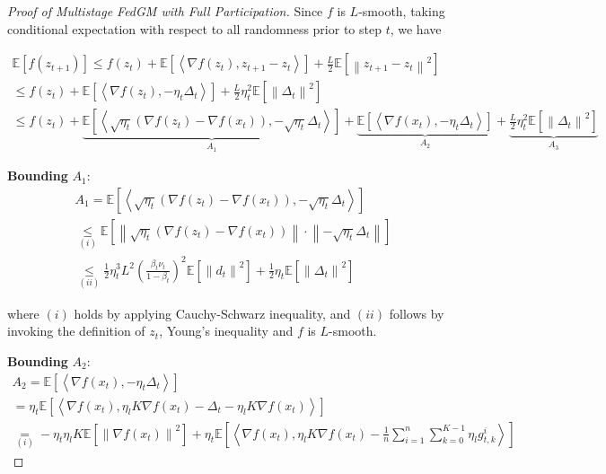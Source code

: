 \begin{proof}[Proof of Multistage FedGM with Full Participation]
Since $f$ is $L$-smooth, taking conditional expectation with respect to all randomness prior to step $t$, we have

\begin{equation}
\begin{gathered}
\mathbb{E}\left[f(z_{t+1})\right]\leq f(z_t)+\mathbb{E}\left[\left\langle \nabla f(z_t),z_{t+1}-z_t \right\rangle\right]+\frac{L}{2}\mathbb{E}\left[\left\| z_{t+1}-z_t\right\|^2\right]\\
\leq f(z_t)+\mathbb{E}\left[\left\langle \nabla f(z_t),-\eta_t \Delta_t \right\rangle\right]+\frac{L}{2}\eta_t^2\mathbb{E}\left[\left\| \Delta_t\right\|^2\right]\\
\le f(z_t)+ \underbrace{\mathbb{E}\left[\left\langle \sqrt{\eta_t} \left(\nabla f(z_t)-\nabla f(x_t)\right),-\sqrt{\eta_t} \Delta_t \right\rangle\right]}_{A_1} + \underbrace{\mathbb{E}\left[\left\langle \nabla f(x_t),-\eta_t \Delta_t \right\rangle\right]}_{A_2} + \underbrace{\frac{L}{2}\eta_t^2\mathbb{E}\left[\left\| \Delta_t\right\|^2\right]}_{A_3}
\end{gathered}\nonumber
\end{equation}

\textbf{Bounding} $A_1$:
\begin{equation}
\begin{gathered}
A_1 =\mathbb{E}\left[\left\langle \sqrt{\eta_t} \left(\nabla f(z_t)-\nabla f(x_t)\right),-\sqrt{\eta_t} \Delta_t \right\rangle\right]\\
\underset{(i)}{\leq}\mathbb{E}\left[\left\|\sqrt{\eta_t} \left(\nabla f(z_t)-\nabla f(x_t)\right)\right\| \cdot \left\|-\sqrt{\eta_t} \Delta_t\right\|\right]\\
\underset{(ii)}{\leq} \frac{1}{2} \eta_t^3 L^2 \left(\frac{\beta_t\nu_t}{1-\beta_t}\right)^2\mathbb{E}\left[\left\| d_t\right\|^2\right] + \frac{1}{2}\eta_t\mathbb{E}\left[\left\|\Delta_t\right\|^2\right]
\end{gathered}\nonumber
\end{equation}

where $(i)$ holds by applying Cauchy-Schwarz inequality, and $(ii)$ follows by invoking the definition of $z_t$, Young’s inequality and $f$ is $L$-smooth.


\textbf{Bounding} $A_2$:
\begin{equation}
\begin{gathered}
A_2=\mathbb{E}\left[\left\langle \nabla f(x_t),-\eta_t \Delta_t \right\rangle\right]\\
=\eta_t\mathbb{E}\left[\left\langle \nabla f(x_t),\eta_l K \nabla f(x_t) - \Delta_t - \eta_l K \nabla f(x_t)  \right\rangle\right]\\
\underset{(i)}{=}-\eta_t \eta_l K \mathbb{E}\left[\left\|\nabla f(x_t) \right\|^2\right] + \eta_t\mathbb{E}\left[\left\langle \nabla f(x_t), \eta_l K \nabla f(x_t) - \frac{1}{n}\sum_{i=1}^n\sum_{k=0}^{K-1}\eta_l g_{t,k}^i \right\rangle\right]
\end{gathered}\nonumber
\end{equation}


\end{proof}
